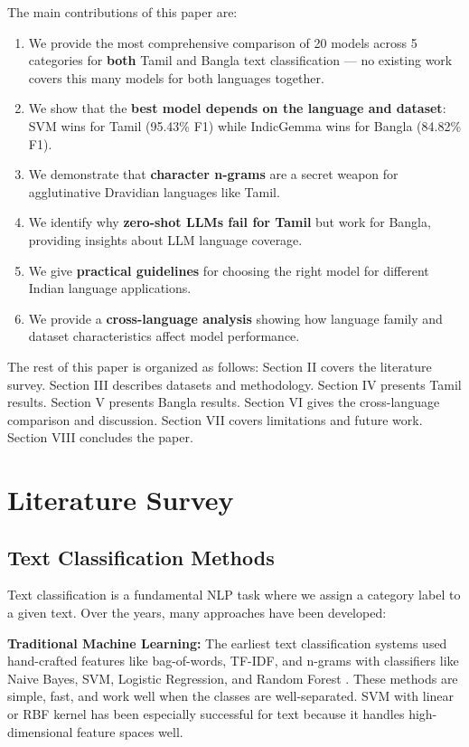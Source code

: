 \documentclass[conference]{IEEEtran}
\begin{document}
The main contributions of this paper are:
\begin{enumerate}
\item We provide the most comprehensive comparison of 20 models across 5 categories for \textbf{both} Tamil and Bangla text classification --- no existing work covers this many models for both languages together.
\item We show that the \textbf{best model depends on the language and dataset}: SVM wins for Tamil (95.43\% F1) while IndicGemma wins for Bangla (84.82\% F1).
\item We demonstrate that \textbf{character n-grams} are a secret weapon for agglutinative Dravidian languages like Tamil.
\item We identify why \textbf{zero-shot LLMs fail for Tamil} but work for Bangla, providing insights about LLM language coverage.
\item We give \textbf{practical guidelines} for choosing the right model for different Indian language applications.
\item We provide a \textbf{cross-language analysis} showing how language family and dataset characteristics affect model performance.
\end{enumerate}

The rest of this paper is organized as follows: Section II covers the literature survey. Section III describes datasets and methodology. Section IV presents Tamil results. Section V presents Bangla results. Section VI gives the cross-language comparison and discussion. Section VII covers limitations and future work. Section VIII concludes the paper.

\section{Literature Survey}

\subsection{Text Classification Methods}

Text classification is a fundamental NLP task where we assign a category label to a given text. Over the years, many approaches have been developed:

\textbf{Traditional Machine Learning:} The earliest text classification systems used hand-crafted features like bag-of-words, TF-IDF, and n-grams with classifiers like Naive Bayes, SVM, Logistic Regression, and Random Forest \cite{joachims1998}. These methods are simple, fast, and work well when the classes are well-separated. SVM with linear or RBF kernel has been especially successful for text because it handles high-dimensional feature spaces well.
\end{document}
